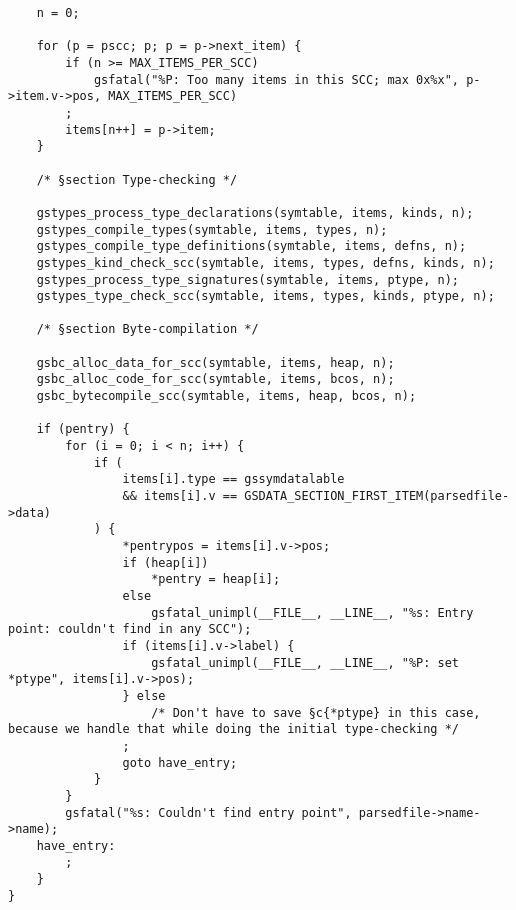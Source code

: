 \documentclass{report}
\begin{document}
\begin{verbatim}
    n = 0;

    for (p = pscc; p; p = p->next_item) {
        if (n >= MAX_ITEMS_PER_SCC)
            gsfatal("%P: Too many items in this SCC; max 0x%x", p->item.v->pos, MAX_ITEMS_PER_SCC)
        ;
        items[n++] = p->item;
    }

    /* §section Type-checking */

    gstypes_process_type_declarations(symtable, items, kinds, n);
    gstypes_compile_types(symtable, items, types, n);
    gstypes_compile_type_definitions(symtable, items, defns, n);
    gstypes_kind_check_scc(symtable, items, types, defns, kinds, n);
    gstypes_process_type_signatures(symtable, items, ptype, n);
    gstypes_type_check_scc(symtable, items, types, kinds, ptype, n);

    /* §section Byte-compilation */

    gsbc_alloc_data_for_scc(symtable, items, heap, n);
    gsbc_alloc_code_for_scc(symtable, items, bcos, n);
    gsbc_bytecompile_scc(symtable, items, heap, bcos, n);

    if (pentry) {
        for (i = 0; i < n; i++) {
            if (
                items[i].type == gssymdatalable
                && items[i].v == GSDATA_SECTION_FIRST_ITEM(parsedfile->data)
            ) {
                *pentrypos = items[i].v->pos;
                if (heap[i])
                    *pentry = heap[i];
                else
                    gsfatal_unimpl(__FILE__, __LINE__, "%s: Entry point: couldn't find in any SCC");
                if (items[i].v->label) {
                    gsfatal_unimpl(__FILE__, __LINE__, "%P: set *ptype", items[i].v->pos);
                } else
                    /* Don't have to save §c{*ptype} in this case, because we handle that while doing the initial type-checking */
                ;
                goto have_entry;
            }
        }
        gsfatal("%s: Couldn't find entry point", parsedfile->name->name);
    have_entry:
        ;
    }
}
\end{verbatim}



\end{document}
